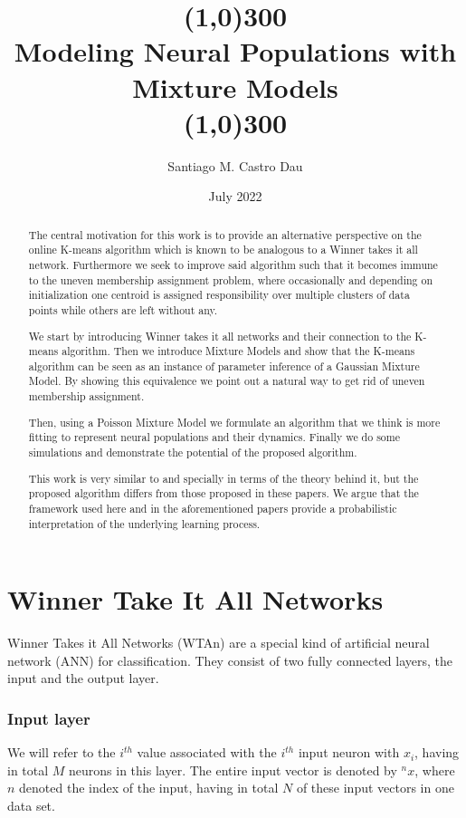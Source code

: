 \documentclass{article}
\title{\color{draculapink}\line(1,0){300}\\Modeling Neural Populations with Mixture Models\\\line(1,0){300}}
\author{\color{draculapurple}Santiago M. Castro Dau}
\date{\color{draculapurple}July 2022}
\begin{document}
\maketitle

\begin{abstract}
The central motivation for this work is to provide an alternative perspective on the
online K-means algorithm which is known to be analogous to a Winner takes it all
network. Furthermore we seek to improve said algorithm such that it becomes immune to the uneven
membership assignment problem, where occasionally and depending on
initialization one centroid is assigned responsibility over multiple
clusters of data points while others are left without any. 

We start by introducing Winner takes it all networks and their connection to the K-means algorithm. Then we introduce Mixture Models and show that the K-means algorithm can be seen as an instance of parameter
inference of a Gaussian Mixture Model. By showing this equivalence we point out a natural way to get rid of uneven
membership assignment. 

Then, using 
a Poisson Mixture Model we formulate an algorithm that we think is more fitting to represent neural populations and their dynamics. Finally we do some simulations and demonstrate the potential of the proposed algorithm. 

This work is very similar to \cite{Moraitis2021} and \cite{Keck2012} specially in terms of the theory
behind it, but the proposed algorithm differs from those proposed in
these papers. We argue that the framework used here and in the aforementioned papers provide a
probabilistic interpretation of the underlying learning process.
\end{abstract}

\pagebreak

\tableofcontents

\pagebreak

\section{Winner Take It All Networks}
Winner Takes it All Networks (WTAn) are a special kind of artificial neural network (ANN) for classification. They consist of two fully connected layers, the input and the output layer. 

\subsubsection*{Input layer}
We will refer to the \(i^{th}\) value associated with the \(i^{th}\) input neuron with \(x_i\), having in total \(M\) neurons in this layer. The entire input vector is denoted by \(^nx\), where \(n\) denoted the index of the input, having in total \(N\) of these input vectors in one data set. 
\end{document}
